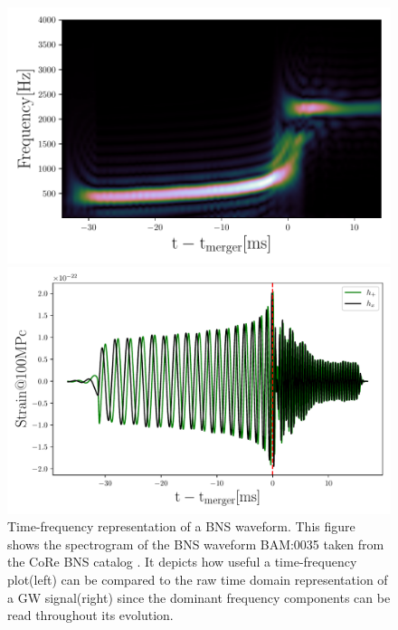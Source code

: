 \begin{figure}[!htbp]
\begin{center}
\begin{minipage}[t]{0.5\linewidth}
\vspace{10pt}
\includegraphics[scale=0.45]{images/Data_analysis/sig_proc/2_2R.pdf}
\end{minipage}%
\begin{minipage}[t]{0.5\linewidth}
\vspace{10pt}
\includegraphics[scale=0.4]{images/Data_analysis/sig_proc/2_2L.pdf}
\end{minipage}
\captionsetup{width=0.8\textwidth}
\caption[Time-frequency representation of a BNS waveform]{Time-frequency representation of a BNS waveform. This figure shows the spectrogram of the BNS waveform BAM:0035 taken from the CoRe BNS catalog \cite{Dietrich:2018phi}. It depicts how useful a time-frequency plot(left) can be compared to the raw time domain representation of a GW signal(right) since the dominant frequency components can be read throughout its evolution.}
\label{fig:2}
\end{center}
\end{figure}

